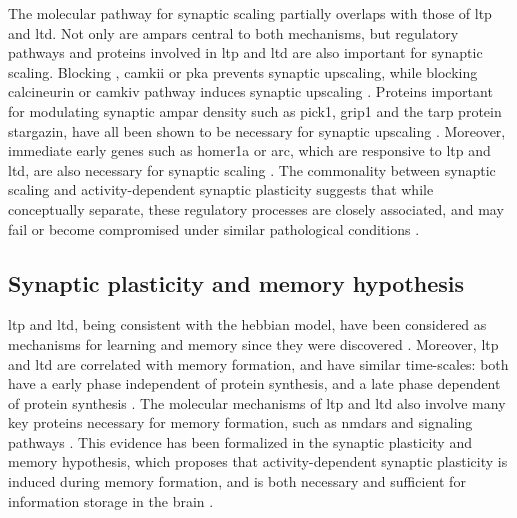 The molecular pathway for synaptic scaling partially overlaps with those of \gls{ltp} and \gls{ltd}. Not only are \glspl{ampar} central to both mechanisms, but regulatory pathways and proteins involved in \gls{ltp} and \gls{ltd} are also important for synaptic scaling. Blocking , \gls{camkii} or \gls{pka} prevents synaptic upscaling, while blocking calcineurin or \gls{camkiv} pathway induces synaptic upscaling \citep{goel11, kim14, ibata08}. Proteins important for modulating synaptic \gls{ampar} density such as \gls{pick1}, \gls{grip1} and the \gls{tarp} protein stargazin, have all been shown to be necessary for synaptic upscaling \citep{anggono11, gainey15, louros14}. Moreover, immediate early genes such as homer1a or \gls{arc}, which are responsive to \gls{ltp} and \gls{ltd}, are also necessary for synaptic scaling \citep{hu10, gao10}. The commonality between synaptic scaling and activity-dependent synaptic plasticity suggests that while conceptually separate, these regulatory processes are closely associated, and may fail or become compromised under similar pathological conditions \citep{fernandes16}.

\subsection{Synaptic plasticity and memory hypothesis}
\Gls{ltp} and \gls{ltd}, being consistent with the hebbian model, have been considered as mechanisms for learning and memory since they were discovered \citep{morris90, bliss93, shors97, martin00}. Moreover, \gls{ltp} and \gls{ltd} are correlated with memory formation, and have similar time-scales: both have a early phase independent of protein synthesis, and a late phase dependent of protein synthesis \citep{abel01, reymann07}. The molecular mechanisms of \gls{ltp} and \gls{ltd} also involve many key proteins necessary for memory formation, such as \glspl{nmdar} and  signaling pathways \citep{martin00}. This evidence has been formalized in the synaptic plasticity and memory hypothesis, which proposes that activity-dependent synaptic plasticity is induced during memory formation, and is both necessary and sufficient for information storage in the brain \citep{martin00}.  

